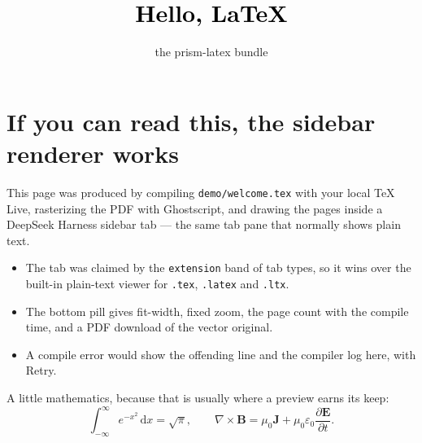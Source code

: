 \documentclass[11pt]{article}
\title{\textcolor{black}{Hello, LaTeX}}\author{the prism-latex bundle}
\date{}
\begin{document}
\maketitle

\section*{If you can read this, the sidebar renderer works}

This page was produced by compiling \texttt{demo/welcome.tex} with your local TeX Live,
rasterizing the PDF with Ghostscript, and drawing the pages inside a DeepSeek Harness
sidebar tab --- the same tab pane that normally shows plain text.

\begin{itemize}
  \item The tab was claimed by the \texttt{extension} band of tab types, so it wins over the
        built-in plain-text viewer for \texttt{.tex}, \texttt{.latex} and \texttt{.ltx}.
  \item The bottom pill gives fit-width, fixed zoom, the page count with the compile time,
        and a PDF download of the vector original.
  \item A compile error would show the offending line and the compiler log here, with Retry.
\end{itemize}

\noindent A little mathematics, because that is usually where a preview earns its keep:
\[
  \int_{-\infty}^{\infty} e^{-x^2}\,\mathrm{d}x = \sqrt{\pi},
  \qquad
  \nabla \times \mathbf{B} = \mu_0 \mathbf{J} + \mu_0 \varepsilon_0 \frac{\partial \mathbf{E}}{\partial t}.
\]
\end{document}
